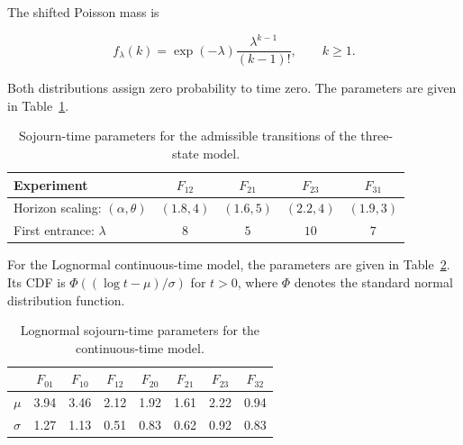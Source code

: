 \documentclass[3p,12pt,authoryear]{elsarticle}
\theoremstyle{definition}
\theoremstyle{remark}
\begin{document}
The shifted Poisson mass is

\begin{equation*}
f_{\lambda}(k)
=
\exp(-\lambda)\frac{\lambda^{k-1}}{(k-1)!},
\qquad k\geq1.
\end{equation*}

Both distributions assign zero probability to time zero. The parameters are given in Table~\ref{tab:discrete-parameters}.

\begin{table}[H]
\centering
\small
\begin{tabular}{lcccc}
\toprule
Experiment & $F_{12}$ & $F_{21}$ & $F_{23}$ & $F_{31}$\\
\midrule
Horizon scaling: $(\alpha,\theta)$ & $(1.8,4)$ & $(1.6,5)$ & $(2.2,4)$ & $(1.9,3)$\\
First entrance: $\lambda$ & $8$ & $5$ & $10$ & $7$\\
\bottomrule
\end{tabular}
\caption{Sojourn-time parameters for the admissible transitions of the three-state model.}
\label{tab:discrete-parameters}
\end{table}

For the Lognormal continuous-time model, the parameters are given in Table~\ref{tab:lognormal-parameters}. Its CDF is $\Phi((\log t-\mu)/\sigma)$ for $t>0$, where $\Phi$ denotes the standard normal distribution function.

\begin{table}[H]
\centering
\small
\begin{tabular}{lccccccc}
\toprule
 & $F_{01}$ & $F_{10}$ & $F_{12}$ & $F_{20}$ & $F_{21}$ & $F_{23}$ & $F_{32}$\\
\midrule
$\mu$ & 3.94 & 3.46 & 2.12 & 1.92 & 1.61 & 2.22 & 0.94\\
$\sigma$ & 1.27 & 1.13 & 0.51 & 0.83 & 0.62 & 0.92 & 0.83\\
\bottomrule
\end{tabular}
\caption{Lognormal sojourn-time parameters for the continuous-time model.}
\label{tab:lognormal-parameters}
\end{table}


\end{document}
